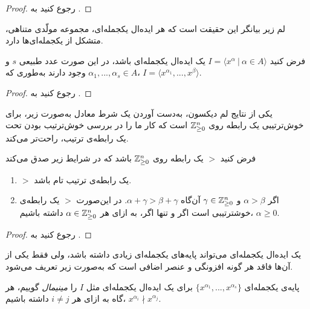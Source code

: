 \begin{proof}
رجوع کنید به 
{\small \cite{IVAcox}}.
\end{proof}

لم زیر بیانگر این  حقیقت است که هر ایده‌ال یکجمله‌ای،  مجموعه‌  مولّدی متناهی،  متشکل از یکجمله‌ای‌ها دارد. 
\begin{lemma}
\label{dickson lemma}
فرض کنید 
$I = \langle x^{\alpha} \ | \ \alpha\in A\rangle$
 یک ایده‌ال یکجمله‌ای باشد، در این صورت عدد طبیعی 
 $s$
 و
 $\alpha_{1},...,\alpha_{s}\in A$
 وجود دارند به‌طوری  که، 
 $I = \langle x^{\alpha_{1}},...,x^{\beta}\rangle$.

\end{lemma}
\begin{proof}
رجوع کنید به 
{\small \cite[ص، ۷۲]{IVAcox}}.
\end{proof}

یکی از نتایج لم دیکسون، به‌دست آوردن یک شرط معادل به‌صورت زیر، برای خوش‌ترتیبی یک رابطه روی 
$\mathbb{Z}_{\geq 0}^{n}$
است که کار ما را در بررسی خوش‌ترتیب بودن تحت یک رابطه‌ی ترتیب، راحت‌تر می‌کند.
\begin{corollary}
فرض کنید 
$>$
یک رابطه‌ روی 
$\mathbb{Z}_{\geq 0}^{n}$
باشد که در شرایط زیر صدق می‌کند
\begin{enumerate}
\item
$>$
یک رابطه‌ی ترتیب تام باشد.
\item
اگر 
$\alpha > \beta$
و 
$\gamma\in\mathbb{Z}_{\geq 0}^{n}$
آن‌گاه 
$\alpha + \gamma > \beta + \gamma$.
در این‌صورت 
$>$
یک رابطه‌ی خوشترتیبی است اگر و تنها اگر، به ازای هر 
$\alpha\in\mathbb{Z}_{\geq 0}^{n}$
داشته باشیم،
$\alpha \geq 0$.
\end{enumerate}
\end{corollary}
\begin{proof}
رجوع کنید به 
{\small \cite[ص، ۷۳]{IVAcox}}.
\end{proof}

یک ایده‌ال یکجمله‌ای می‌تواند پایه‌های یکجمله‌ای زیادی داشته باشد، ولی فقط یکی از آن‌ها فاقد هر گونه افزونگی و عنصر اضافی است که به‌صورت زیر تعریف می‌شود.
\begin{definition}
پایه‌ی یکجمله‌ای 
$\{x^{\alpha_{1}},...,x^{\alpha_{s}}\}$
برای یک ایده‌ال یکجمله‌ای  مثل 
$I$
را 
\textit{مینیمال}
گوییم، هر گاه به ازای هر 
$i\neq j$
داشته باشیم، 
$x^{\alpha_{i}}\nmid x^{\alpha_{j}}$.
\end{definition}

